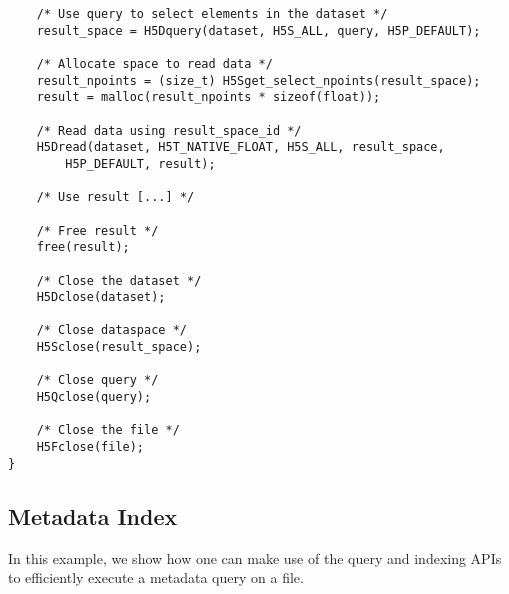 {\begin{lstlisting}
    /* Use query to select elements in the dataset */
    result_space = H5Dquery(dataset, H5S_ALL, query, H5P_DEFAULT);

    /* Allocate space to read data */ 
    result_npoints = (size_t) H5Sget_select_npoints(result_space);
    result = malloc(result_npoints * sizeof(float));

    /* Read data using result_space_id */
    H5Dread(dataset, H5T_NATIVE_FLOAT, H5S_ALL, result_space,
        H5P_DEFAULT, result);

    /* Use result [...] */

    /* Free result */
    free(result);

    /* Close the dataset */
    H5Dclose(dataset);

    /* Close dataspace */
    H5Sclose(result_space);

    /* Close query */
    H5Qclose(query);

    /* Close the file */
    H5Fclose(file);
}
\end{lstlisting}
}

\subsection{Metadata Index}
In this example, we show how one can make use of the query and
indexing APIs to efficiently execute a metadata query on a file.


